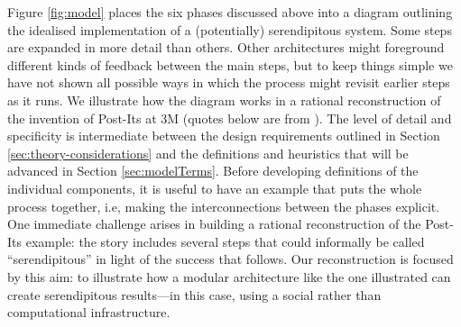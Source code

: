 Figure \ref{fig:model} places the six phases discussed above into a
diagram outlining the idealised implementation of a (potentially)
serendipitous system.  Some steps are expanded in more detail than
others.  Other architectures might foreground different kinds
of feedback between the main steps, but to keep things simple we
have not shown all possible ways in which the process might revisit
earlier steps as it runs.
We illustrate how the diagram works in a rational reconstruction
of the invention of Post-Its\textsuperscript{\textregistered} at 3M
(quotes below are from \citet{FT3M}).
The level of detail and specificity is intermediate between the design
requirements outlined in Section \ref{sec:theory-considerations} and
the definitions and heuristics that will be advanced in Section
\ref{sec:modelTerms}.  Before developing definitions of the individual
components, it is useful to have an example that puts
the whole process together, i.e, making the interconnections between
the phases explicit.
One immediate challenge arises in building a rational reconstruction of
the Post-Its\textsuperscript{\textregistered} example: the
story includes several steps that could informally be called
``serendipitous'' in light of the success that follows. Our reconstruction
is focused by this aim: to illustrate how a modular architecture
like the one illustrated can create serendipitous results---in this
case, using a social rather than computational infrastructure.
